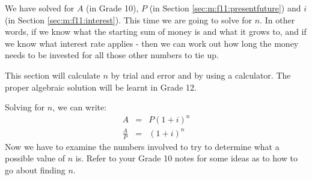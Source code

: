 We have solved for $A$ (in Grade 10), $P$ (in Section \ref{sec:m:f11:presentfuture}) and $i$ (in Section \ref{sec:m:f11:interest}). This time we are going to solve for $n$. In other words, if we know what the starting sum of money is and what it grows to, and if we know what interest rate applies - then we can work out how long the money needs to be invested for all those other numbers to tie up.

This section will calculate $n$ by trial and error and by using a calculator. The proper algebraic solution will be learnt in Grade 12.

Solving for $n$, we can write:
\begin{eqnarray*}
A &=& P(1+i)^n\\
\frac{A}{P}&=&(1+i)^n
\end{eqnarray*}
Now we have to examine the numbers involved to try to determine what a possible value of $n$ is. Refer to your Grade 10 notes for some ideas as to how to go about finding $n$.


